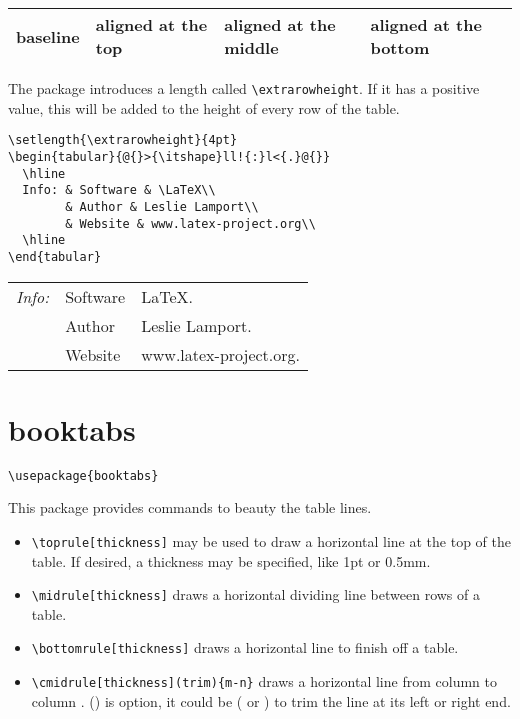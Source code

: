 \begin{tabular}{@{}lp{1.2cm}m{1.2cm}b{1.2cm}@{}}
  \hline
  baseline & aligned at the top & aligned at the middle & aligned at the bottom\\
  \hline
\end{tabular}


The  package introduces a length called \lstinline|\extrarowheight|.
If it has a positive value, this will be added to the height of every row of the table.


\begin{lstlisting}
\setlength{\extrarowheight}{4pt}
\begin{tabular}{@{}>{\itshape}ll!{:}l<{.}@{}}
  \hline
  Info: & Software & \LaTeX\\
        & Author & Leslie Lamport\\
        & Website & www.latex-project.org\\
  \hline
\end{tabular}
\end{lstlisting}

\setlength{\extrarowheight}{4pt}
\begin{tabular}{@{}>{\itshape}ll!{:}l<{.}@{}}
  \hline
  Info: & Software & \LaTeX\\
        & Author & Leslie Lamport\\
        & Website & www.latex-project.org\\
  \hline
\end{tabular}


\section{booktabs}
\label{sec:booktabs}
\begin{lstlisting}
\usepackage{booktabs}
\end{lstlisting}

This package provides commands to beauty the table lines.
\begin{itemize}
\item \lstinline|\toprule[thickness]| may be used to draw a horizontal line at the top of the table. If desired, a thickness may be specified, like 1pt or 0.5mm.
\item \lstinline|\midrule[thickness]| draws a horizontal dividing line between rows of a table.
\item \lstinline|\bottomrule[thickness]| draws a horizontal line to finish off a table.
  
\item \lstinline|\cmidrule[thickness](trim){m-n}| draws a horizontal line from column  to column . () is option, it could be ( or ) to trim the line at its left or right end. 
\end{itemize}

